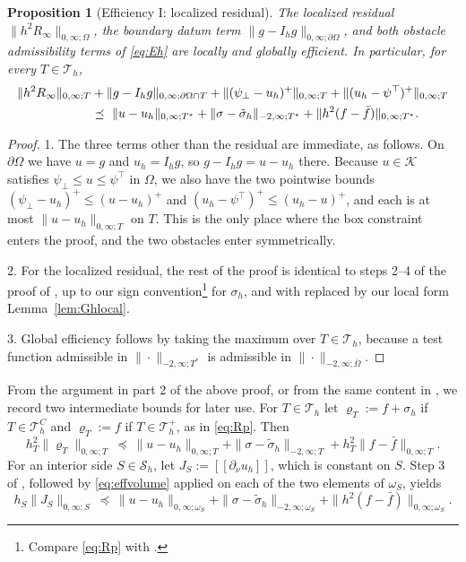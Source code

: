 \documentclass[12pt]{amsart}
\numberwithin{equation}{section}
\theoremstyle{plain}
\newtheorem{proposition}[theorem]{Proposition}
\theoremstyle{definition}
\theoremstyle{remark}
\newcommand{\Om}{\Omega}
\newcommand{\dOm}{\partial\Omega}
\newcommand{\psilo}{\psi_\bot}
\newcommand{\psiup}{\psi^\top}
\newcommand{\Th}{\mathcal{T}_h}
\newcommand{\Sh}{\mathcal{S}_h}
\newcommand{\Ih}{I_h}
\newcommand{\Thplus}{\Th^+}
\newcommand{\ThC}{\Th^C}
\newcommand{\jump}[1]{[\![#1]\!]}
\begin{document}
\begin{proposition}[Efficiency I: localized residual]
\label{prop:effresidual}
The localized residual $\|h^2R_\infty\|_{0,\infty;\Om}$, the boundary datum term $\|g-\Ih g\|_{0,\infty;\dOm}$, and both obstacle admissibility terms of \eqref{eq:Eh} are locally and globally efficient.  In particular, for every $T \in \Th$,
\begin{align}
\label{eq:effresidual}
  \|h^2 R_\infty\|_{0,\infty;T} &+ \|g - \Ih g\|_{0,\infty;\dOm \cap T} + \|(\psilo-u_h)^+\|_{0,\infty;T} + \|(u_h-\psiup)^+\|_{0,\infty;T} \\
  &\preceq\ \|u-u_h\|_{0,\infty;T^*} + \|\sigma-\tilde\sigma_h\|_{-2,\infty;T^*} + \|h^2(f-\bar f)\|_{0,\infty;T^*}. \notag
\end{align}
\end{proposition}

\begin{proof}
1.  The three terms other than the residual are immediate, as follows.  On $\dOm$ we have $u = g$ and $u_h = \Ih g$, so $g - \Ih g = u - u_h$ there.  Because $u \in \mathcal{K}$ satisfies $\psilo \le u \le \psiup$ in $\Om$, we also have the two pointwise bounds $(\psilo - u_h)^+ \le (u-u_h)^+$ and $(u_h - \psiup)^+ \le (u_h-u)^+$, and each is at most $\|u-u_h\|_{0,\infty;T}$ on $T$.  This is the only place where the box constraint enters the proof, and the two obstacles enter symmetrically.

2.  For the localized residual, the rest of the proof is identical to steps 2--4 of the proof of \cite[Proposition 6.2]{NSV03}, up to our sign convention\footnote{Compare \eqref{eq:Rp} with \cite[formula (3.7)]{NSV03}.} for $\sigma_h$, and with \cite[formula (3.11)]{NSV03} replaced by our local form Lemma~\ref{lem:Ghlocal}.

3.  Global efficiency follows by taking the maximum over $T \in \Th$, because a test function admissible in $\|\cdot\|_{-2,\infty;T^*}$ is admissible in $\|\cdot\|_{-2,\infty;\bar\Om}$.
\end{proof}

From the argument in part 2 of the above proof, or from the same content in \cite[Proposition 6.2]{NSV03}, we record two intermediate bounds for later use.  For $T \in \Th$ let $\varrho_T := f + \sigma_h$ if $T \in \ThC$ and $\varrho_T := f$ if $T \in \Thplus$, as in \eqref{eq:Rp}.  Then
\begin{equation}
\label{eq:effvolume}
  h_T^2\|\varrho_T\|_{0,\infty;T} \ \preceq\ \|u-u_h\|_{0,\infty;T} + \|\sigma-\tilde\sigma_h\|_{-2,\infty;T} + h_T^2\|f-\bar f\|_{0,\infty;T}.
\end{equation}
For an interior side $S \in \Sh$, let $J_S := \jump{\partial_\nu u_h}$, which is constant on $S$.  Step 3 of \cite[Proposition 6.2]{NSV03}, followed by \eqref{eq:effvolume} applied on each of the two elements of $\omega_S$, yields
\begin{equation}
\label{eq:effjump}
  h_S\|J_S\|_{0,\infty;S} \ \preceq\ \|u-u_h\|_{0,\infty;\omega_S} + \|\sigma-\tilde\sigma_h\|_{-2,\infty;\omega_S} + \|h^2(f-\bar f)\|_{0,\infty;\omega_S}.
\end{equation}
\end{document}
